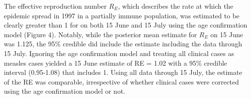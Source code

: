 The effective reproduction number $R_E$, which describes the rate at which the epidemic spread in 1997 in a partially immune population, was estimated to be clearly greater than 1 for on both 15 June and 15 July using the age confirmation model (Figure 4). Notably, while the posterior mean estimate for $R_E$ on 15 June was 1.125, the 95\% credible did include the estimate including the data through 15 July. Ignoring the age
confirmation model and treating all clinical cases as measles cases yielded a 15 June estimate of RE = 1.02 with a 95\% credible interval
(0.95-1.08) that includes 1. Using all data through 15 July, the estimate of the RE was comparable, irrespective of whether clinical cases were corrected using the age confirmation model or not.